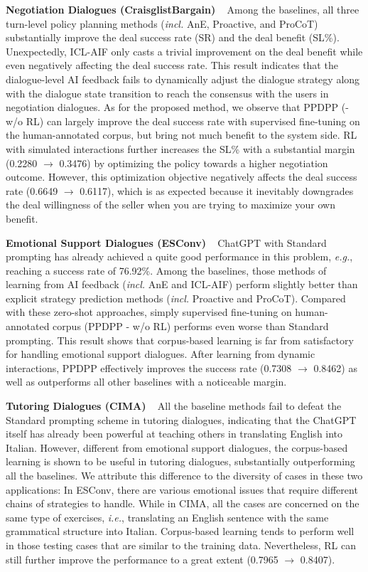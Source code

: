 \documentclass{article} %
\begin{document}
\noindent \textbf{Negotiation Dialogues (CraisglistBargain)} ~
Among the baselines, all three turn-level policy planning methods (\textit{incl.} AnE, Proactive, and ProCoT) substantially improve the deal success rate (SR) and the deal benefit (SL\%). Unexpectedly, ICL-AIF only casts a trivial improvement on the deal benefit while even negatively affecting the deal success rate. This result indicates that the dialogue-level AI feedback fails to dynamically adjust the dialogue strategy along with the dialogue state transition to reach the consensus with the users in negotiation dialogues.    
As for the proposed method, we observe that PPDPP (- w/o RL) can largely improve the deal success rate with supervised fine-tuning on the human-annotated corpus, but bring not much benefit to the system side. 
RL with simulated interactions further increases the SL\% with a substantial margin (0.2280 $\rightarrow$ 0.3476) by optimizing the policy towards a higher negotiation outcome. 
However, this optimization objective  negatively affects the deal success rate (0.6649 $\rightarrow$ 0.6117), which is as expected because it inevitably downgrades the deal willingness of the seller when you are trying to maximize your own benefit. 


\noindent \textbf{Emotional Support Dialogues (ESConv)} ~
ChatGPT with Standard prompting has already achieved a quite good performance in this problem, \textit{e.g.}, reaching a success rate of 76.92\%. 
Among the baselines, those methods of learning from AI feedback (\textit{incl.} AnE and ICL-AIF) perform slightly better than explicit strategy prediction methods (\textit{incl.} Proactive and ProCoT). 
Compared with these zero-shot approaches, simply supervised fine-tuning on human-annotated corpus (PPDPP - w/o RL) performs even worse than Standard prompting. 
This result shows that corpus-based learning is far from satisfactory for handling emotional support dialogues. 
After learning from dynamic interactions, PPDPP effectively improves the success rate (0.7308 $\rightarrow$ 0.8462) as well as outperforms all other baselines with a noticeable margin. 


\noindent \textbf{Tutoring Dialogues (CIMA)} ~
All the baseline methods fail to defeat the Standard prompting scheme in tutoring dialogues, indicating that the ChatGPT itself has already been powerful at teaching others in translating English into Italian. 
However, different from emotional support dialogues, the corpus-based learning is shown to be useful in tutoring dialogues, substantially outperforming all the baselines. 
We attribute this difference to the diversity of cases in these two applications: In ESConv, there are various emotional issues that require different chains of strategies to handle. While in CIMA, all the cases are concerned on the same type of exercises, \textit{i.e.}, translating an English sentence with the same grammatical structure into Italian. Corpus-based learning tends to perform well in those testing cases that are similar to the training data. 
Nevertheless, RL can still further improve the performance to a great extent (0.7965 $\rightarrow$ 0.8407). 
\end{document}
